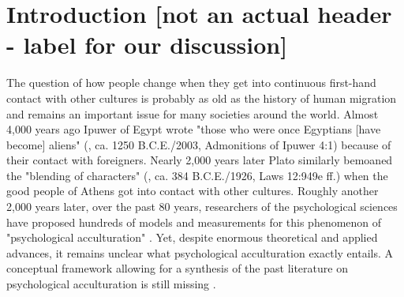 \documentclass[man, 12pt, a4paper]{apa7}
\begin{document}
%
%
%

\section{Introduction [not an actual header - label for our discussion]}

The question of how people change when they get into continuous first-hand contact with other cultures is probably as old as the history of human migration and remains an important issue for many societies around the world. 
Almost 4,000 years ago Ipuwer of Egypt wrote "those who were once Egyptians [have become] aliens" (\citeauthor{Ipuwer2003}, ca. 1250 B.C.E./2003, Admonitions of Ipuwer 4:1) because of their contact with foreigners. Nearly 2,000 years later Plato similarly bemoaned the "blending of characters" (\citeauthor{Plato1926}, ca. 384 B.C.E./1926, Laws 12:949e ff.) when the good people of Athens got into contact with other cultures. Roughly another 2,000 years later, over the past 80 years, researchers of the psychological sciences have proposed hundreds of models and measurements for this phenomenon of "psychological acculturation" \citep[][]{Rudmin2003a}. Yet, despite enormous theoretical and applied advances, it remains unclear what psychological acculturation exactly entails. A conceptual framework allowing for a synthesis of the past literature on psychological acculturation is still missing \citep{Birman2014c}.
\end{document}
